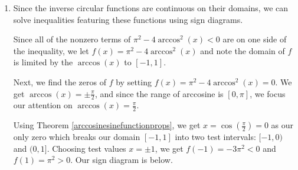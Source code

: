\documentclass{ximera}
\begin{document}
\begin{example}
\begin{explanation}
\begin{enumerate}
 

Factoring, (don't let the $\pi$ throw you!) we get $(4u+\pi)(u - \pi) = 0$, so $u = \arctan(t) = -\frac{\pi}{4}$ or $u = \arctan(t) = \pi$.  

 

Since $-\frac{\pi}{4}$ is in the range of arctangent, but $\pi$ is not, we only get solutions from the first equation.  Using Theorem \ref{arctangentcotangentfunctionprops}, we get

\[ \begin{array}{rclr}

\arctan(t) & = & -\frac{\pi}{4} & \\
\tan(\arctan(t)) & = & \tan\left(-\frac{\pi}{4}\right) & \\
t & = & -1 & \text{Since $\tan(\arctan(u)) = u$.} \\ \end{array}\]

We verify this result graphically below.

\begin{center}
\end{center}

\item Since the inverse circular functions are continuous on their domains, we can solve inequalities featuring these functions using sign diagrams. 

 

Since all of the nonzero terms of  $\pi^2-4\arccos^{2}(x) < 0$ are on one side of the inequality, we let $f(x) = \pi^2-4\arccos^{2}(x)$ and note the domain of $f$ is limited by the $\arccos(x)$ to $[-1,1]$.  

 

Next, we find the zeros of $f$ by setting $f(x) = \pi^2-4\arccos^{2}(x) = 0$.  We get $\arccos(x) = \pm \frac{\pi}{2}$, and since the range of arccosine is $[0,\pi]$, we focus our attention on $\arccos(x) = \frac{\pi}{2}$.  

 

Using Theorem \ref{arccosinesinefunctionprops}, we get $x = \cos\left(\frac{\pi}{2}\right) = 0$ as our only zero which breaks our domain $[-1,1]$ into two test intervals: $[-1,0)$ and $(0,1]$.  Choosing test values $x = \pm 1$, we get $f(-1) = -3\pi^2 < 0$ and $f(1) = \pi^2 > 0$.  Our sign diagram is below.

\begin{image}
% 
\end{image}
\end{enumerate}
\end{explanation}
\end{example}
\end{document}
